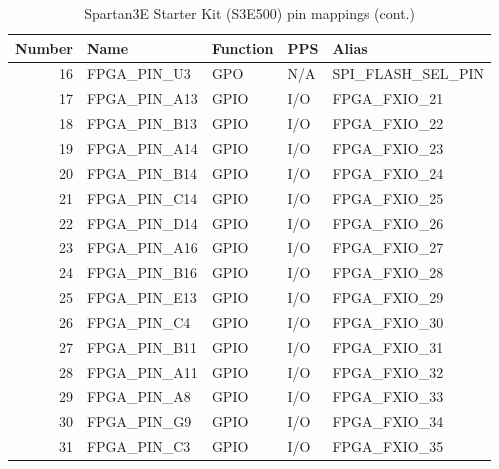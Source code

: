 \begin{table}[H]
\begin{center}
\begin{tabularx}{14cm}{rlllX}
Number & Name & Function & PPS & Alias \\
\hline

16 & FPGA\_PIN\_U3  & GPO & N/A & SPI\_FLASH\_SEL\_PIN \\
17 & FPGA\_PIN\_A13 & GPIO & I/O & FPGA\_FXIO\_21 \\
18 & FPGA\_PIN\_B13 & GPIO & I/O & FPGA\_FXIO\_22 \\
19 & FPGA\_PIN\_A14 & GPIO & I/O & FPGA\_FXIO\_23 \\
20 & FPGA\_PIN\_B14 & GPIO & I/O & FPGA\_FXIO\_24 \\
21 & FPGA\_PIN\_C14 & GPIO & I/O & FPGA\_FXIO\_25 \\
22 & FPGA\_PIN\_D14 & GPIO & I/O & FPGA\_FXIO\_26 \\
23 & FPGA\_PIN\_A16 & GPIO & I/O & FPGA\_FXIO\_27 \\
24 & FPGA\_PIN\_B16 & GPIO & I/O & FPGA\_FXIO\_28 \\
25 & FPGA\_PIN\_E13 & GPIO & I/O & FPGA\_FXIO\_29 \\
26 & FPGA\_PIN\_C4  & GPIO & I/O & FPGA\_FXIO\_30 \\
27 & FPGA\_PIN\_B11 & GPIO & I/O & FPGA\_FXIO\_31 \\
28 & FPGA\_PIN\_A11 & GPIO & I/O & FPGA\_FXIO\_32 \\
29 & FPGA\_PIN\_A8  & GPIO & I/O & FPGA\_FXIO\_33 \\
30 & FPGA\_PIN\_G9  & GPIO & I/O & FPGA\_FXIO\_34 \\
31 & FPGA\_PIN\_C3  & GPIO & I/O & FPGA\_FXIO\_35 \\



\end{tabularx}
\caption{Spartan3E Starter Kit (S3E500) pin mappings (cont.)}
\end{center}
\end{table}

